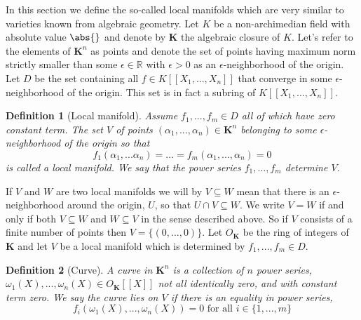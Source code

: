 \documentclass{article}
\newtheorem{definition}{Definition}[section]
\newcommand{\mbb}[1]{\mathbb{#1}}
\numberwithin{equation}{section}
\begin{document}
In this section we define the so-called local manifolds which are very similar to varieties known from algebraic geometry. Let $K$ be a non-archimedian field with absolute value $\abs{}$ and denote by $\bm K$ the algebraic closure of $K$. Let's refer to the elements of $\bm K^n$ as points and denote the set of points having maximum norm strictly smaller than some $\epsilon \in \mbb R$ with $\epsilon > 0$ as an $\epsilon$-neighborhood of the origin. Let $D$ be the set containing all $f \in K[[X_1, ..., X_n]]$ that converge in some $\epsilon$-neighborhood of the origin. This set is in fact a subring of $K[[X_1, ..., X_n]]$.

\begin{definition}[Local manifold]
	Assume $f_1, ..., f_m \in D$ all of which have zero constant term. The set $V$ of points $(\alpha_1, ..., \alpha_n) \in \bm K^n$ belonging to some $\epsilon$-neighborhood of the origin so that $$f_1(\alpha_1, ... \alpha_n) = ... = f_m(\alpha_1, ..., \alpha_n) = 0$$
	is called a local manifold. We say that the power series $f_1, ..., f_m$ determine $V$.
\end{definition}
If $V$ and $W$ are two local manifolds we will by $V \subseteq W$ mean that there is an $\epsilon$-neighborhood around the origin, $U$, so that $U \cap V \subseteq W$. We write $V = W$ if and only if both $V \subseteq W$ and $W \subseteq V$ in the sense described above. So if $V$ consists of a finite number of points then $V = \{(0,...,0)\}$. Let $O_{\bm K}$ be the ring of integers of $\bm K$ and let $V$ be a local manifold which is determined by $f_1, ..., f_m \in D$.




\begin{definition}[Curve]
	A curve in $\bm{K}^n$ is a collection of $n$ power series, $\omega_1(X), ..., \omega_n(X) \in O_{\bm K}[[X]]$ not all identically zero, and with constant term zero. We say the curve lies on $V$ if there is an equality in power series, $$f_i(\omega_1(X), ..., \omega_n(X)) = 0 \text{ for all } i \in \{1, ..., m \}$$
\end{definition}
\end{document}
